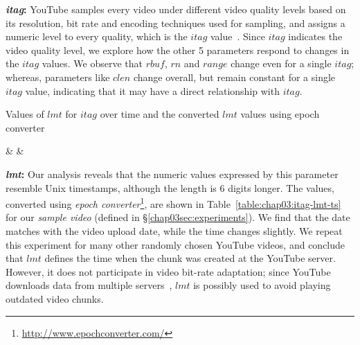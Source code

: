 {\bf {\em itag}:} YouTube samples every video under different video quality levels based on its resolution, bit rate and encoding techniques used for sampling, and assigns a numeric level to every quality, which is the $itag$ value~\cite{itag}.
Since $itag$ indicates the video quality level, we explore how the other 5 parameters respond to changes in the $itag$ values.
We observe that $rbuf$, $rn$ and $range$ change even for a single $itag$; whereas, parameters like $clen$ change overall, but remain constant for a single $itag$ value, indicating that it may have a direct relationship with $itag$. 

\begin{table}[!t]
 \small
\caption{\small{Values of $lmt$ for $itag$ over time and the converted $lmt$ values using epoch converter}}
\label{table:chap03:itag-lmt-ts}
 \centering
{\csvcoli & \csvcolii & \csvcoliii}%
\end{table}


{\bf {\em lmt}:} Our analysis reveals that the numeric values expressed by this parameter resemble Unix timestamps, although the length is $6$ digits longer.
The values, converted using {\em epoch converter}\footnote{\url{http://www.epochconverter.com/}}, are shown in Table~\ref{table:chap03:itag-lmt-ts} for our {\it sample video} (defined in \S\ref{chap03sec:experiments}).
We find that the date matches with the video upload date, while the time changes slightly.
We repeat this experiment for many other randomly chosen YouTube videos, and conclude that $lmt$ defines the time when the chunk was created at the YouTube server.
However, it does not participate in video bit-rate adaptation; since YouTube downloads data from multiple servers~\cite{krishnappa2013dashing}, $lmt$ is possibly used to avoid playing outdated video chunks.

